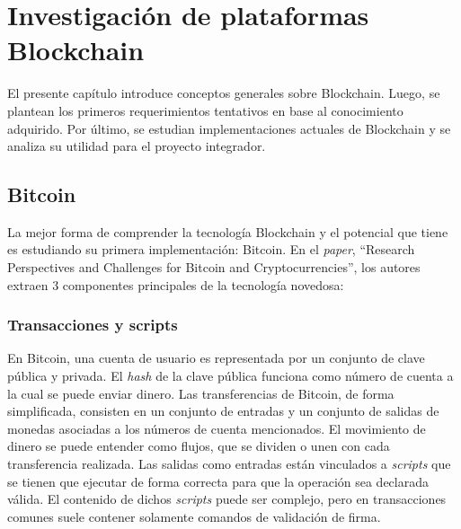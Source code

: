 \chapter{Investigación de plataformas Blockchain} %

\label{Chapter2} %

El presente capítulo introduce conceptos generales sobre Blockchain. Luego, se plantean los primeros requerimientos tentativos en base al conocimiento adquirido. Por último, se estudian implementaciones actuales de Blockchain y se analiza su utilidad para el proyecto integrador.


\section{Bitcoin}

La mejor forma de comprender la tecnología Blockchain y el potencial que tiene es estudiando su primera implementación: Bitcoin. En el \textit{paper}, “Research Perspectives and Challenges for Bitcoin and Cryptocurrencies”\cite{7163021}, los autores extraen 3 componentes principales de la tecnología novedosa:

\subsection{Transacciones y scripts}
En Bitcoin, una cuenta de usuario es representada por un conjunto de clave pública y privada. El \textit{hash} de la clave pública funciona como número de cuenta a la cual se puede enviar dinero.
Las transferencias de Bitcoin, de forma simplificada, consisten en un conjunto de entradas y un conjunto de salidas de monedas asociadas a los números de cuenta mencionados. El movimiento de dinero se puede entender como flujos, que se dividen o unen con cada transferencia realizada. Las salidas como entradas están vinculados a \textit{scripts} que se tienen que ejecutar de forma correcta para que la operación sea declarada válida. El contenido de dichos \textit{scripts} puede ser complejo, pero en transacciones comunes suele contener solamente comandos de validación de firma.
